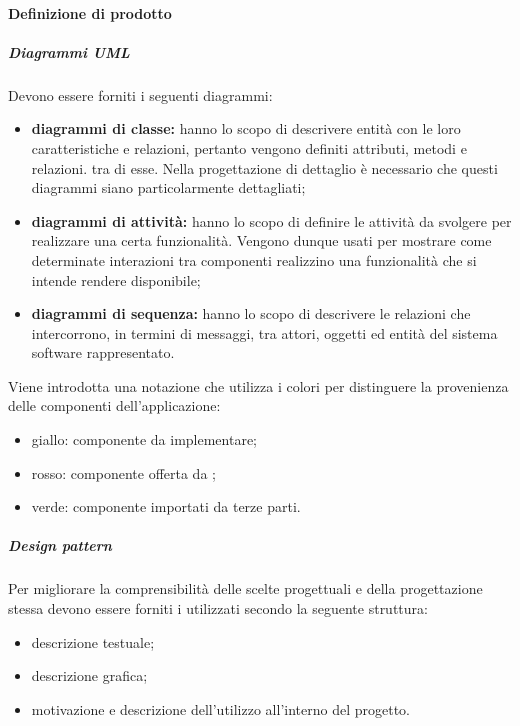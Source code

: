                 \paragraph{Definizione di prodotto}
                \subparagraph{Diagrammi UML}
                Devono essere forniti i seguenti diagrammi:
                \begin{itemize}
                    \item \textbf{diagrammi di classe:}  hanno lo scopo di descrivere entità con le loro caratteristiche e relazioni, pertanto vengono definiti attributi, metodi e relazioni. tra di esse. Nella progettazione di dettaglio è necessario che questi diagrammi siano particolarmente dettagliati;
                    \item \textbf{diagrammi di attività:} hanno lo scopo di definire le attività da svolgere per realizzare una certa funzionalità. Vengono dunque usati per mostrare come determinate interazioni tra componenti realizzino una funzionalità che si intende rendere disponibile;
                    \item \textbf{diagrammi di sequenza:} hanno lo scopo di descrivere le relazioni che intercorrono, in termini di messaggi, tra attori, oggetti ed entità del sistema software rappresentato.
                \end{itemize}
	            Viene introdotta una notazione che utilizza i colori per distinguere la provenienza delle componenti dell'applicazione:
	            \begin{itemize}
	            	\item giallo: componente da implementare;
	            	\item rosso: componente offerta da \riskapp;
	            	\item verde: componente importati da terze parti.
	            \end{itemize}
	            \subparagraph{Design pattern}
	            Per migliorare la comprensibilità delle scelte progettuali e della progettazione stessa devono essere forniti i  utilizzati secondo la seguente struttura:
	            \begin{itemize}
	            	\item descrizione testuale;
	            	\item descrizione grafica;
	            	\item motivazione e descrizione dell'utilizzo all'interno del progetto.
	            \end{itemize}
